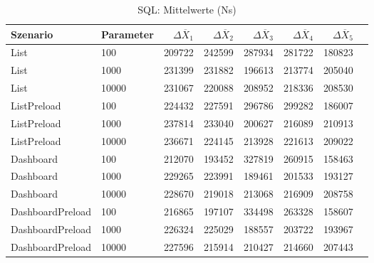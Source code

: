 
\begin{table}[ht]
\setlength{\extrarowheight}{-1pt}
\centering
\caption{SQL: Mittelwerte (Ns)}
\begin{tabular}{llrrrrrr}
\toprule
Szenario & Parameter & ${\Delta \overline{X}_1}$ & ${\Delta \overline{X}_2}$ & ${\Delta \overline{X}_3}$ & ${\Delta \overline{X}_4}$ & ${\Delta \overline{X}_5}$ \\
\midrule
	List & 100 & 209722 & 242599 & 287934 & 281722 & 180823 \\
	List & 1000 & 231399 & 231882 & 196613 & 213774 & 205040 \\
	List & 10000 & 231067 & 220088 & 208952 & 218336 & 208530 \\
	ListPreload & 100 & 224432 & 227591 & 296786 & 299282 & 186007 \\
	ListPreload & 1000 & 237814 & 233040 & 200627 & 216089 & 210913 \\
	ListPreload & 10000 & 236671 & 224145 & 213928 & 221613 & 209022 \\
	Dashboard & 100 & 212070 & 193452 & 327819 & 260915 & 158463 \\
	Dashboard & 1000 & 229265 & 223991 & 189461 & 201533 & 193127 \\
	Dashboard & 10000 & 228670 & 219018 & 213068 & 216909 & 208758 \\
	DashboardPreload & 100 & 216865 & 197107 & 334498 & 263328 & 158607 \\
	DashboardPreload & 1000 & 226324 & 225029 & 188557 & 203722 & 193967 \\
	DashboardPreload & 10000 & 227596 & 215914 & 210427 & 214660 & 207443 \\
\bottomrule
\end{tabular}
\label{tab:mittelwerte_sql_ns}
\end{table}
	
